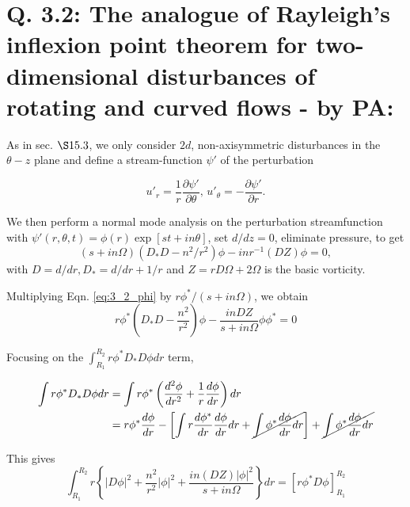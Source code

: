 \section{Q. 3.2: The analogue of Rayleigh's inflexion point theorem for two-dimensional disturbances of rotating and curved flows - by PA:}
As in sec. $\S 15.3$, we only consider $2d$, non-axisymmetric disturbances in the $\theta-z$ plane and define a stream-function $\psi'$ of the perturbation

\begin{equation}\label{eq:3_2_streamfunction}
 u'_{r} = \frac{1}{r}\frac{\partial \psi'}{\partial \theta} \textrm{, } u'_{\theta} = -\frac{\partial \psi'}{\partial r}. 
\end{equation}

We then perform a normal mode analysis on the perturbation streamfunction with $\psi'(r, \theta, t) = \phi(r) \exp{[st + i n \theta]}$, set $d/dz = 0$, eliminate pressure, to get
\begin{equation}\label{eq:3_2_phi}
 (s + i n \Omega)(D_{*}D - n^{2}/r^{2})\phi - inr^{-1}(DZ)\phi = 0,
\end{equation}
with $D = d/dr, D_{*} = d/dr + 1/r$ and $Z = r D\Omega + 2\Omega$ is the basic vorticity. 

Multiplying Eqn. \ref{eq:3_2_phi} by $r\phi^{*}/(s + i n \Omega)$, we obtain
\begin{equation}\label{eq:3_2_integrand}
 r\phi^{*}\left(D_{*}D - \frac{n^{2}}{r^{2}} \right)\phi - \frac{in DZ}{s+in\Omega}\phi \phi^{*} = 0
\end{equation}

Focusing on the $\int_{R_{1}}^{R_{2}} r\phi^{*}D_{*}D \phi dr$ term, 

\begin{align}
 \begin{split}
  \int r\phi^{*}D_{*}D \phi dr & = \int r\phi^{*}\left(\frac{d^{2} \phi}{dr^{2}} + \frac{1}{r}\frac{d\phi}{dr}\right)dr\\
%  
  & = r\phi^{*}\frac{d\phi}{dr} - \left[\int r \frac{d\phi^{*}}{dr}\frac{d\phi}{dr} dr+ \cancel{\int \phi^{*}\frac{d\phi}{dr} dr}\right] + \cancel{\int \phi^{*}\frac{d\phi}{dr} dr} 
 \end{split}
\end{align}

This gives
\begin{equation}\label{eq:3_2_integral}
 \int_{R_{1}}^{R_{2}} r \left\{ |D\phi|^{2} + \frac{n^{2}}{r^{2}}|\phi|^{2} + \frac{in(DZ)|\phi|^{2}}{s + in\Omega}\right\}dr = \left[ r \phi^{*}D\phi\right]_{R_{1}}^{R_{2}}
\end{equation}

